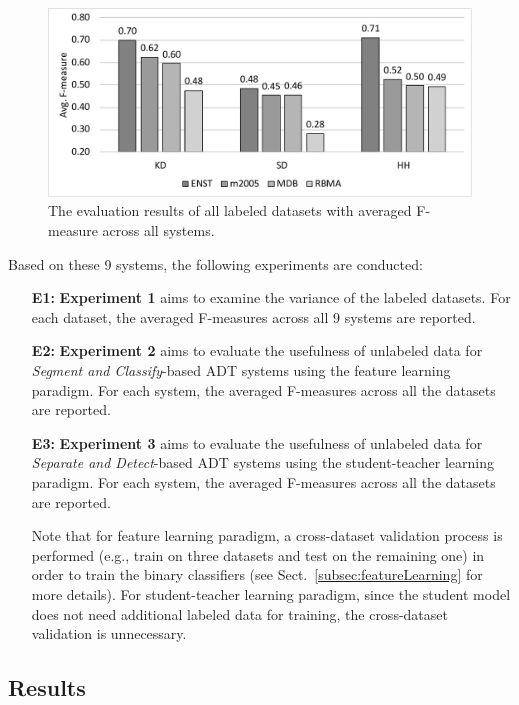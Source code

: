 \documentclass{article}
\begin{document}
\begin{figure}
\centering
\includegraphics[width = \columnwidth]{./figs/avgAcrossDatasets.pdf}
\caption{The evaluation results of all labeled datasets with averaged F-measure across all systems.}
\label{fig:resultsAcrossDatasets}
\end{figure}

Based on these 9 systems, the following experiments are conducted:
\begin{enumerate}
\item [\textbf{E1:}]\textbf{Experiment 1} aims to examine the variance of the labeled datasets. For each dataset, the averaged F-measures across all 9 systems are reported. 
\item [\textbf{E2:}]\textbf{Experiment 2} aims to evaluate the usefulness of unlabeled data for \textit{Segment and Classify}-based ADT systems using the feature learning paradigm. For each system, the averaged F-measures across all the datasets are reported. 
\item [\textbf{E3:}]\textbf{Experiment 3} aims to evaluate the usefulness of unlabeled data for \textit{Separate and Detect}-based ADT systems using the student-teacher learning paradigm. For each system, the averaged F-measures across all the datasets are reported. 

Note that for feature learning paradigm, a cross-dataset validation process is performed (e.g., train on three datasets and test on the remaining one) in order to train the binary classifiers (see Sect.~\ref{subsec:featureLearning} for more details). For student-teacher learning paradigm, since the student model does not need additional labeled data for training, the cross-dataset validation is unnecessary. 
\end{enumerate}

\subsection{Results}
\end{document}
